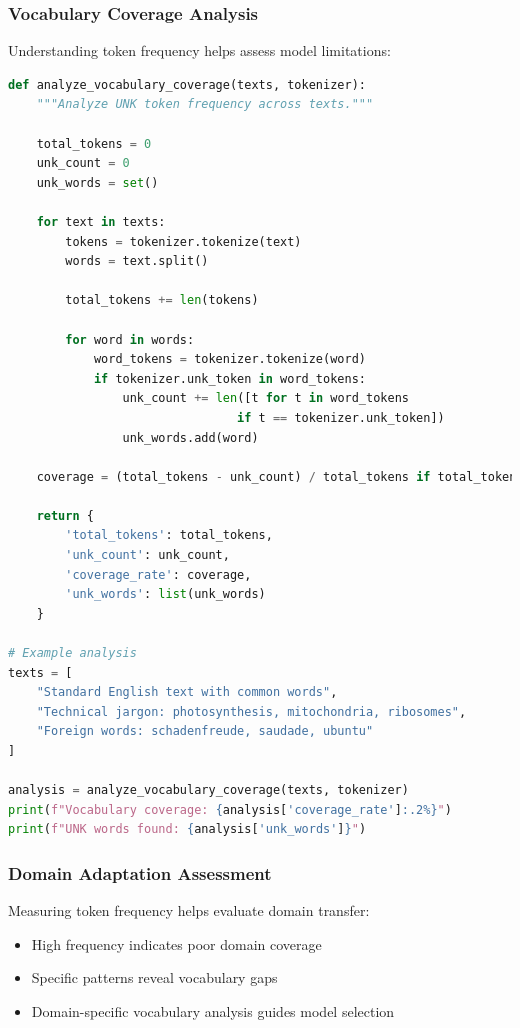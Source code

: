 \subsubsection{Vocabulary Coverage Analysis}
Understanding \unk{} token frequency helps assess model limitations:

\begin{lstlisting}[language=Python]
def analyze_vocabulary_coverage(texts, tokenizer):
    """Analyze UNK token frequency across texts."""
    
    total_tokens = 0
    unk_count = 0
    unk_words = set()
    
    for text in texts:
        tokens = tokenizer.tokenize(text)
        words = text.split()
        
        total_tokens += len(tokens)
        
        for word in words:
            word_tokens = tokenizer.tokenize(word)
            if tokenizer.unk_token in word_tokens:
                unk_count += len([t for t in word_tokens 
                                if t == tokenizer.unk_token])
                unk_words.add(word)
    
    coverage = (total_tokens - unk_count) / total_tokens if total_tokens > 0 else 0
    
    return {
        'total_tokens': total_tokens,
        'unk_count': unk_count,
        'coverage_rate': coverage,
        'unk_words': list(unk_words)
    }

# Example analysis
texts = [
    "Standard English text with common words",
    "Technical jargon: photosynthesis, mitochondria, ribosomes",
    "Foreign words: schadenfreude, saudade, ubuntu"
]

analysis = analyze_vocabulary_coverage(texts, tokenizer)
print(f"Vocabulary coverage: {analysis['coverage_rate']:.2%}")
print(f"UNK words found: {analysis['unk_words']}")
\end{lstlisting}

\subsubsection{Domain Adaptation Assessment}
Measuring \unk{} token frequency helps evaluate domain transfer:

\begin{itemize}
\item High \unk{} frequency indicates poor domain coverage
\item Specific \unk{} patterns reveal vocabulary gaps
\item Domain-specific vocabulary analysis guides model selection
\end{itemize}

